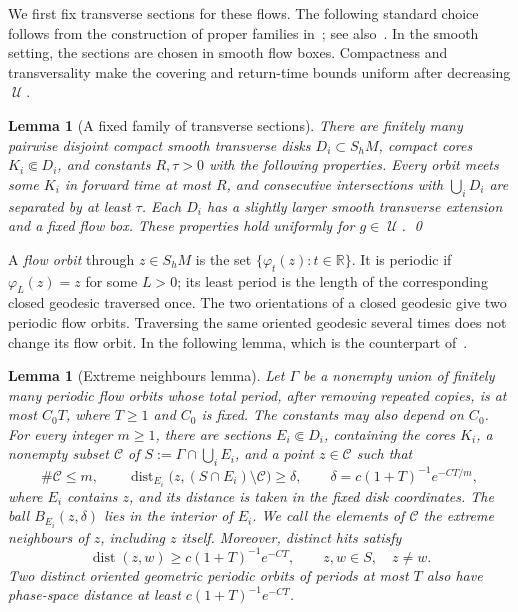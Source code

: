 \documentclass[10pt,oneside,reqno]{amsproc}
\numberwithin{equation}{section}
\newtheorem{lemma}[theorem]{Lemma}
\theoremstyle{definition}
\theoremstyle{remark}
\DeclareMathOperator{\dist}{dist}
\DeclareMathOperator{\cU}{{\mathscr U}}
\renewcommand{\ge}{\geqslant}
\renewcommand{\le}{\leqslant}
\begin{document}
We first fix transverse sections for these flows. The following standard choice follows from the construction of proper families in~\cite[Section~7]{Bowen}; see also~\cite[Section~3.2]{CLT}. In the smooth setting, the sections are chosen in smooth flow boxes. Compactness and transversality make the covering and return-time bounds uniform after decreasing $\cU$.

\begin{lemma}[A fixed family of transverse sections]
\label{geo:sections}
There are finitely many pairwise disjoint compact smooth transverse disks $D_i\subset S_hM$, compact cores $K_i\Subset D_i$, and constants $R,\tau>0$ with the following properties. Every orbit meets some $K_i$ in forward time at most $R$, and consecutive intersections with $\bigcup_iD_i$ are separated by at least $\tau$. Each $D_i$ has a slightly larger smooth transverse extension and a fixed flow box. These properties hold uniformly for $g\in\cU$. \qed
\end{lemma}

A \emph{flow orbit} through $z\in S_hM$ is the set $\{\varphi_t(z):t\in\mathbb R\}$. It is periodic if $\varphi_L(z)=z$ for some $L>0$; its least period is the length of the corresponding closed geodesic traversed once. The two orientations of a closed geodesic give two periodic flow orbits. Traversing the same oriented geodesic several times does not change its flow orbit. In the following lemma, which is the counterpart of~\cite[Appendix~A, Lemma~A.1]{DK}.

\begin{lemma}[Extreme neighbours lemma]
\label{geo:cluster}
\label{geo:phaseseparation}
Let $\Gamma$ be a nonempty union of finitely many periodic flow orbits whose total period, after removing repeated copies, is at most $C_0T$, where $T\ge1$ and $C_0$ is fixed. The constants may also depend on $C_0$. For every integer $m\ge1$, there are sections $E_i\Subset D_i$, containing the cores $K_i$, a nonempty subset $\mathcal C$ of $S:=\Gamma\cap\bigcup_iE_i$, and a point $z\in\mathcal C$ such that
\begin{equation}
 \#\mathcal C\le m,\qquad \dist_{E_i}\bigl(z,(S\cap E_i)\setminus\mathcal C\bigr)\ge\delta,\qquad \delta=c(1+T)^{-1}e^{-CT/m},
 \label{geo:sparseball}
\end{equation}
where $E_i$ contains $z$, and its distance is taken in the fixed disk coordinates. The ball $B_{E_i}(z,\delta)$ lies in the interior of $E_i$. We call the elements of $\mathcal C$ the \emph{extreme neighbours} of $z$, including $z$ itself. Moreover, distinct hits satisfy
\begin{equation}
 \dist(z,w)\ge c(1+T)^{-1}e^{-CT},\qquad z,w\in S,\quad z\ne w.
 \label{geo:hitsep}
\end{equation}
Two distinct oriented geometric periodic orbits of periods at most $T$ also have phase-space distance at least $c(1+T)^{-1}e^{-CT}$.
\end{lemma}
\end{document}
